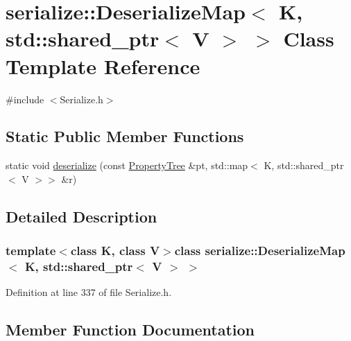 \hypertarget{classserialize_1_1_deserialize_map_3_01_k_00_01std_1_1shared__ptr_3_01_v_01_4_01_4}{}\section{serialize\+:\+:Deserialize\+Map$<$ K, std\+:\+:shared\+\_\+ptr$<$ V $>$ $>$ Class Template Reference}
\label{classserialize_1_1_deserialize_map_3_01_k_00_01std_1_1shared__ptr_3_01_v_01_4_01_4}


{\ttfamily \#include $<$Serialize.\+h$>$}

\subsection*{Static Public Member Functions}
\begin{DoxyCompactItemize}
\item 
static void \hyperlink{classserialize_1_1_deserialize_map_3_01_k_00_01std_1_1shared__ptr_3_01_v_01_4_01_4_ad2807cf1ee4670cbda806ad46c57f360}{deserialize} (const \hyperlink{namespacesolar__core_adeda2737d6938c190eb774a5b2495045}{Property\+Tree} \&pt, std\+::map$<$ K, std\+::shared\+\_\+ptr$<$ V $>$$>$ \&r)
\end{DoxyCompactItemize}


\subsection{Detailed Description}
\subsubsection*{template$<$class K, class V$>$class serialize\+::\+Deserialize\+Map$<$ K, std\+::shared\+\_\+ptr$<$ V $>$ $>$}



Definition at line 337 of file Serialize.\+h.



\subsection{Member Function Documentation}
\hypertarget{classserialize_1_1_deserialize_map_3_01_k_00_01std_1_1shared__ptr_3_01_v_01_4_01_4_ad2807cf1ee4670cbda806ad46c57f360}{}
